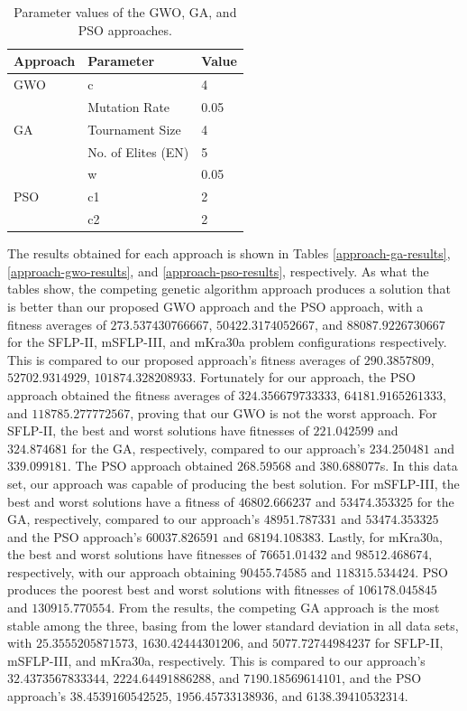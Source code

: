 \begin{table}[h!]
	\centering
	\begin{tabular}{|l|l|l|}
		\hline
		\textbf{Approach}   & \textbf{Parameter} & \textbf{Value} \\ \hline
		GWO                 & c                  & 4              \\ \hline
		\multirow{3}{*}{GA} & Mutation Rate      & 0.05           \\ \cline{2-3} 
		& Tournament Size    & 4              \\ \cline{2-3} 
		& No. of Elites (EN) & 5              \\ \hline
		\multirow{3}{*}{PSO} & w      & 0.05           \\ \cline{2-3} 
		& c1    & 2              \\ \cline{2-3} 
		& c2 	& 2              \\ \hline
	\end{tabular}
	\caption{Parameter values of the GWO, GA, and PSO approaches.}
	\label{approach-parameters}
\end{table}

The results obtained for each approach is shown in Tables \ref{approach-ga-results}, \ref{approach-gwo-results}, and \ref{approach-pso-results}, respectively. As what the tables show, the competing genetic algorithm approach produces a solution that is better than our proposed GWO approach and the PSO approach, with a fitness averages of $273.537430766667$, $50422.3174052667$, and $88087.9226730667$ for the SFLP-II, mSFLP-III, and mKra30a problem configurations respectively. This is compared to our proposed approach's fitness averages of $290.3857809$, $52702.9314929$, $101874.328208933$. Fortunately for our approach, the PSO approach obtained the fitness averages of $324.356679733333$, $64181.9165261333$, and $118785.277772567$, proving that our GWO is not the worst approach. For SFLP-II, the best and worst solutions have fitnesses of $221.042599$ and $324.874681$ for the GA, respectively, compared to our approach's $234.250481$ and $339.099181$. The PSO approach obtained $268.59568$ and $380.688077$s. In this data set, our approach was capable of producing the best solution. For mSFLP-III, the best and worst solutions have a fitness of $46802.666237$ and $53474.353325$ for the GA, respectively, compared to our approach's $48951.787331$ and $53474.353325$ and the PSO approach's $60037.826591$ and $68194.108383$. Lastly, for mKra30a, the best and worst solutions have fitnesses of $76651.01432$ and $98512.468674$, respectively, with our approach obtaining $90455.74585$ and $118315.534424$. PSO produces the poorest best and worst solutions with fitnesses of $106178.045845$ and $130915.770554$. From the results, the competing GA approach is the most stable among the three, basing from the lower standard deviation in all data sets, with $25.3555205871573$, $1630.42444301206$, and $5077.72744984237$ for SFLP-II, mSFLP-III, and mKra30a, respectively. This is compared to our approach's $32.4373567833344$, $2224.64491886288$, and $7190.18569614101$, and the PSO approach's $38.4539160542525$, $1956.45733138936$, and $6138.39410532314$. %

